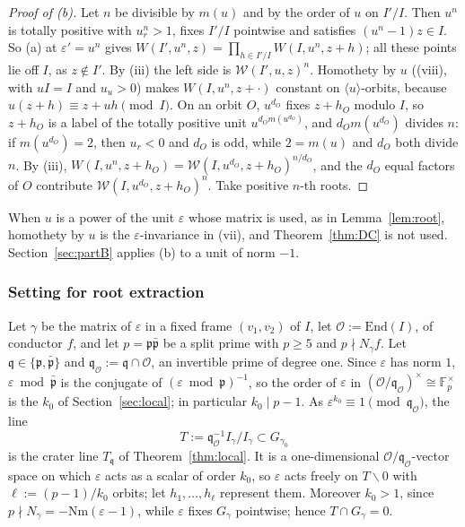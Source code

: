 \documentclass[11pt]{amsart}
\numberwithin{equation}{section}
\theoremstyle{plain}
\theoremstyle{definition}
\theoremstyle{remark}
\begin{document}
\begin{proof}[Proof of (b)]
Let \(n\) be divisible by \(m(u)\) and by the order of \(u\) on \(I'/I\). Then \(u^n\) is totally positive with \(u^n_r>1\), fixes \(I'/I\) pointwise and satisfies \((u^n-1)z\in I\). So (a) at \(\varepsilon'=u^n\) gives \(W(I',u^n,z)=\prod_{h\in I'/I}W(I,u^n,z+h)\); all these points lie off \(I\), as \(z\notin I'\). By (iii) the left side is \(\mathcal W(I',u,z)^n\). Homothety by \(u\) ((viii), with \(uI=I\) and \(u_u>0\)) makes \(W(I,u^n,z+\cdot)\) constant on \(\langle u\rangle\)-orbits, because \(u(z+h)\equiv z+uh\pmod I\). On an orbit \(O\), \(u^{d_O}\) fixes \(z+h_O\) modulo \(I\), so \(z+h_O\) is a label of the totally positive unit \(u^{d_Om(u^{d_O})}\), and \(d_Om(u^{d_O})\) divides \(n\): if \(m(u^{d_O})=2\), then \(u_r<0\) and \(d_O\) is odd, while \(2=m(u)\) and \(d_O\) both divide \(n\). By (iii), \(W(I,u^n,z+h_O)=\mathcal W(I,u^{d_O},z+h_O)^{n/d_O}\), and the \(d_O\) equal factors of \(O\) contribute \(\mathcal W(I,u^{d_O},z+h_O)^n\). Take positive \(n\)-th roots.
\end{proof}

When \(u\) is a power of the unit \(\varepsilon\) whose matrix is used, as in Lemma~\ref{lem:root}, homothety by \(u\) is the \(\varepsilon\)-invariance in (vii), and Theorem~\ref{thm:DC} is not used. Section~\ref{sec:partB} applies (b) to a unit of norm \(-1\).

\subsubsection*{Setting for root extraction}
Let \(\gamma\) be the matrix of \(\varepsilon\) in a fixed frame \((v_1,v_2)\) of \(I\), let \(\mathcal O:=\mathrm{End}(I)\), of conductor \(f\), and let \(p=\mathfrak p\bar{\mathfrak p}\) be a split prime with \(p\ge5\) and \(p\nmid N_\gamma f\). Let \(\mathfrak q\in\{\mathfrak p,\bar{\mathfrak p}\}\) and \(\mathfrak q_{\mathcal O}:=\mathfrak q\cap\mathcal O\), an invertible prime of degree one. Since \(\varepsilon\) has norm \(1\), \(\varepsilon\bmod\bar{\mathfrak p}\) is the conjugate of \((\varepsilon\bmod\mathfrak p)^{-1}\), so the order of \(\varepsilon\) in \((\mathcal O/\mathfrak q_{\mathcal O})^\times\cong\mathbb F_p^\times\) is the \(k_0\) of Section~\ref{sec:local}; in particular \(k_0\mid p-1\). As \(\varepsilon^{k_0}\equiv1\pmod{\mathfrak q_{\mathcal O}}\), the line
\[T:=\mathfrak q_{\mathcal O}^{-1}I_\gamma/I_\gamma\subset G_{\gamma_0}\]
is the crater line \(T_{\mathfrak q}\) of Theorem~\ref{thm:local}. It is a one-dimensional \(\mathcal O/\mathfrak q_{\mathcal O}\)-vector space on which \(\varepsilon\) acts as a scalar of order \(k_0\), so \(\varepsilon\) acts freely on \(T\smallsetminus0\) with \(\ell:=(p-1)/k_0\) orbits; let \(h_1,\dots,h_\ell\) represent them. Moreover \(k_0>1\), since \(p\nmid N_\gamma=-\mathrm{Nm}(\varepsilon-1)\), while \(\varepsilon\) fixes \(G_\gamma\) pointwise; hence \(T\cap G_\gamma=0\).
\end{document}

